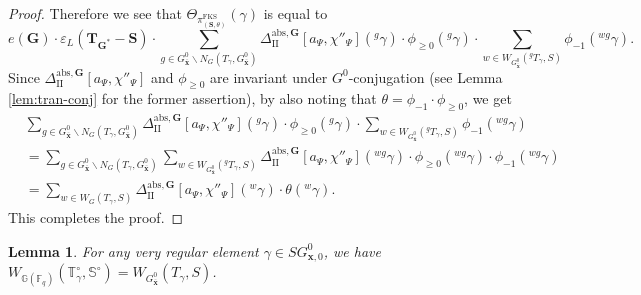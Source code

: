 \documentclass{amsart}
\newcommand{\abs}{\mathrm{abs}}
\newcommand{\FKS}{\mathrm{FKS}}
\newcommand{\bfT}{\mathbf{T}}
\newcommand{\x}{\mathbf{x}}
\newcommand{\bbT}{\mathbb{T}}
\newcommand{\F}{\mathbb{F}}
\newcommand{\bbS}{\mathbb{S}}
\newcommand{\bbG}{\mathbb{G}}
\newcommand{\bfG}{\mathbf{G}}
\newcommand{\bfS}{\mathbf{S}}
\newcommand{\II}{\mathrm{II}}
\theoremstyle{plain}
\newtheorem{lem}[thm]{Lemma}
\theoremstyle{definition}
\theoremstyle{remark}
\theoremstyle{theorem}
\begin{document}
\begin{proof}
Therefore we see that $\Theta_{\pi^{\FKS}_{(\bfS,\theta)}}(\gamma)$ is equal to
\[
e(\bfG)\cdot\varepsilon_{L}(\bfT_{\bfG^{\ast}}-\bfS)\cdot
\sum_{g \in G^{0}_{\bar{\x}}\backslash N_{G}(T_{\gamma},G^{0}_{\bar{\x}})}
\Delta_{\II}^{\abs,\bfG}[a_{\Psi},\chi''_{\Psi}]({}^{g}\gamma)\cdot\phi_{\geq0}({}^{g}\gamma)\cdot
\sum_{w\in W_{G^{0}_{\bar{\x}}}({}^{g}T_{\gamma},S)}\phi_{-1}({}^{wg}\gamma).
\]
Since $\Delta_{\II}^{\abs,\bfG}[a_{\Psi},\chi''_{\Psi}]$ and $\phi_{\geq0}$ are invariant under $G^{0}$-conjugation (see Lemma \ref{lem:tran-conj} for the former assertion), by also noting that $\theta=\phi_{-1}\cdot\phi_{\geq0}$, we get
\begin{align*}
&\sum_{g \in G^{0}_{\bar{\x}}\backslash N_{G}(T_{\gamma},G^{0}_{\bar{\x}})}
\Delta_{\II}^{\abs,\bfG}[a_{\Psi},\chi''_{\Psi}]({}^{g}\gamma)\cdot\phi_{\geq0}({}^{g}\gamma)\cdot
\sum_{w\in W_{G^{0}_{\bar{\x}}}({}^{g}T_{\gamma},S)}\phi_{-1}({}^{wg}\gamma)\\
&=
\sum_{g \in G^{0}_{\bar{\x}}\backslash N_{G}(T_{\gamma},G^{0}_{\bar{\x}})}
\sum_{w\in W_{G^{0}_{\bar{\x}}}({}^{g}T_{\gamma},S)}
\Delta_{\II}^{\abs,\bfG}[a_{\Psi},\chi''_{\Psi}]({}^{wg}\gamma)\cdot\phi_{\geq0}({}^{wg}\gamma)\cdot
\phi_{-1}({}^{wg}\gamma)\\
&=
\sum_{w\in W_{G}(T_{\gamma},S)}\Delta_{\II}^{\abs,\bfG}[a_{\Psi},\chi''_{\Psi}]({}^{w}\gamma)\cdot\theta({}^{w}\gamma).
\end{align*}
This completes the proof.
\end{proof}

\begin{lem}\label{lem:Weyl-reduction}
For any very regular element $\gamma\in SG^{0}_{\x,0}$, we have $W_{\bbG(\F_{q})}(\bbT^{\circ}_{\gamma},\bbS^{\circ})=W_{G^{0}_{\bar{\x}}}(T_{\gamma},S)$.
\end{lem}
\end{document}
